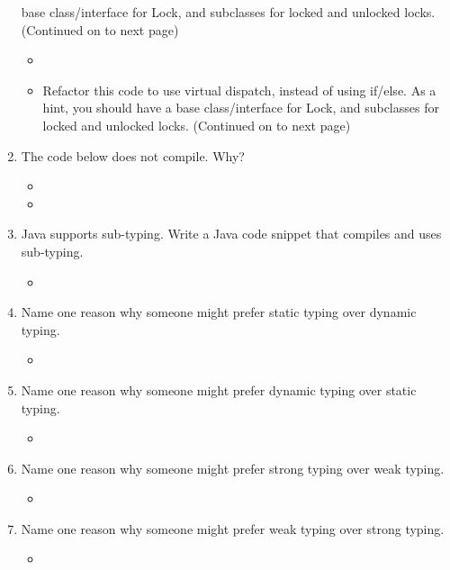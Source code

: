 \documentclass[12pt,a4paper]{article}
\begin{document}
\begin{enumerate}
    base class/interface for Lock, and subclasses for locked and unlocked locks. (Continued on to
    next page) %
    \begin{itemize}
      \item[] 
      \item[] Refactor this code to use virtual dispatch, instead of using if/else. As a hint, you should have a
      base class/interface for Lock, and subclasses for locked and unlocked locks. (Continued on to
      next page) 
    \end{itemize}
    \clearpage
    \item The code below does not compile. Why? %
    \begin{itemize}
      \item[] 
      \item[] 
    \end{itemize}
    \clearpage
    \item Java supports sub-typing. Write a Java code snippet that compiles and uses sub-typing. %
    \begin{itemize}
      \item 
    \end{itemize} 
    \item Name one reason why someone might prefer static typing over dynamic typing. %
    \begin{itemize}
      \item 
    \end{itemize}
    \item Name one reason why someone might prefer dynamic typing over static typing. %
    \begin{itemize}
      \item 
    \end{itemize}
    \item Name one reason why someone might prefer strong typing over weak typing. %
    \begin{itemize}
      \item 
    \end{itemize}
    \item Name one reason why someone might prefer weak typing over strong typing. %
    \begin{itemize}
      \item 
    \end{itemize}
  \end{enumerate}
\end{document}
